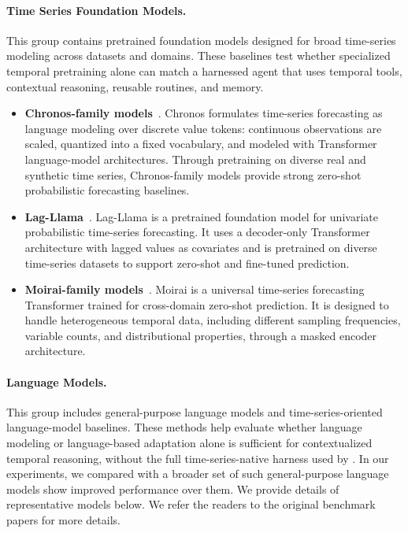 \paragraph{Time Series Foundation Models.}
This group contains pretrained foundation models designed for broad
time-series modeling across datasets and domains. These baselines test whether specialized temporal pretraining alone can match a harnessed agent that uses temporal tools, contextual reasoning, reusable routines, and memory.

\begin{itemize}
    \item \textbf{Chronos-family models}~\citep{DBLP:journals/tmlr/AnsariSTZMSSRPK24, DBLP:journals/corr/abs-2510-15821}.
    Chronos formulates time-series forecasting as language modeling over discrete value tokens: continuous observations are scaled, quantized into a fixed vocabulary, and modeled with Transformer language-model architectures. Through pretraining on diverse real and synthetic time series, Chronos-family models provide strong zero-shot probabilistic forecasting baselines.

    \item \textbf{Lag-Llama}~\citep{rasul2023lag}.
    Lag-Llama is a pretrained foundation model for univariate probabilistic time-series forecasting. It uses a decoder-only Transformer architecture with lagged values as covariates and is pretrained on diverse time-series datasets to support zero-shot and fine-tuned prediction. 
    \item \textbf{Moirai-family models}~\citep{DBLP:conf/icml/WooLKXSS24}.
    Moirai is a universal time-series forecasting Transformer trained for cross-domain zero-shot prediction. It is designed to handle heterogeneous temporal data, including different sampling frequencies, variable counts, and distributional properties, through a masked encoder architecture.
\end{itemize}

\paragraph{Language Models.}
This group includes general-purpose language models and time-series-oriented language-model baselines. These methods help evaluate whether language modeling or language-based adaptation alone is sufficient for contextualized temporal reasoning, without the full time-series-native harness used by \method. In our experiments, we compared with a broader set of such general-purpose language models show improved performance over them. We provide details of representative models below. We refer the readers to the original benchmark papers \cite{DBLP:conf/icml/WilliamsAMZSRRL25, DBLP:journals/corr/abs-2601-18744} for more details.

